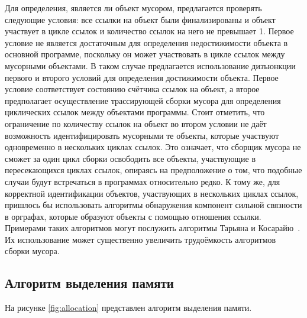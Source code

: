 Для определения, является ли объект мусором, предлагается проверять следующие условия: все ссылки на объект были финализированы и объект участвует в цикле ссылок и количество ссылок на него не превышает 1. Первое условие не является достаточным для определения недостижимости объекта в основной программе, поскольку он может участвовать в цикле ссылок между мусорными объектами. В таком случае предлагается использование дизъюнкции первого и второго условий для определения достижимости объекта. Первое условие соответствует состоянию счётчика ссылок на объект, а второе предполагает осуществление трассирующей сборки мусора для определения циклических ссылок между объектами программы. Стоит отметить, что ограничение по количеству ссылок на объект во втором условии не даёт возможность идентифицировать мусорными те объекты, которые участвуют одновременно в нескольких циклах ссылок. Это означает, что сборщик мусора не сможет за один цикл сборки освободить все объекты, участвующие в пересекающихся циклах ссылок, опираясь на предположение о том, что подобные случаи будут встречаться в программах относительно редко. К тому же, для корректной идентификации объектов, участвующих в нескольких циклах ссылок, пришлось бы использовать алгоритмы обнаружения компонент сильной связности в орграфах, которые образуют объекты с помощью отношения ссылки. Примерами таких алгоритмов могут послужить алгоритмы Тарьяна и Косарайю~\cite{graph_algorithms}. Их использование может существенно увеличить трудоёмкость алгоритмов сборки мусора.

\subsection*{Алгоритм выделения памяти}

На рисунке \ref{fig:allocation} представлен алгоритм выделения памяти.

